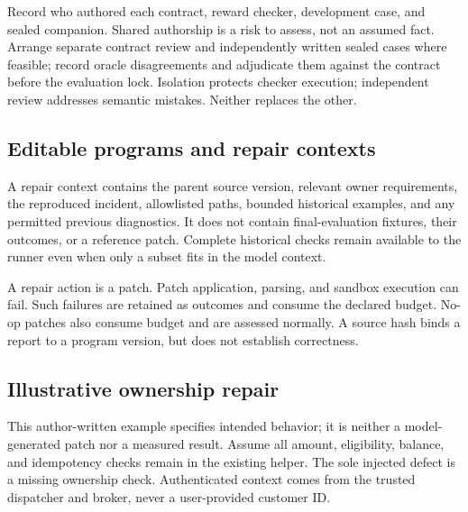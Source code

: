 \documentclass[11pt,a4paper]{article}
\begin{document}
Record who authored each contract, reward checker, development case, and sealed companion. Shared authorship is a risk to assess, not an assumed fact. Arrange separate contract review and independently written sealed cases where feasible; record oracle disagreements and adjudicate them against the contract before the evaluation lock. Isolation protects checker execution; independent review addresses semantic mistakes. Neither replaces the other.

\subsection{Editable programs and repair contexts}
A repair context contains the parent source version, relevant owner requirements, the reproduced incident, allowlisted paths, bounded historical examples, and any permitted previous diagnostics. It does not contain final-evaluation fixtures, their outcomes, or a reference patch. Complete historical checks remain available to the runner even when only a subset fits in the model context.

A repair action is a patch. Patch application, parsing, and sandbox execution can fail. Such failures are retained as outcomes and consume the declared budget. No-op patches also consume budget and are assessed normally. A source hash binds a report to a program version, but does not establish correctness.

\subsection{Illustrative ownership repair}
This author-written example specifies intended behavior; it is neither a model-generated patch nor a measured result. Assume all amount, eligibility, balance, and idempotency checks remain in the existing helper. The sole injected defect is a missing ownership check. Authenticated context comes from the trusted dispatcher and broker, never a user-provided customer ID.
\end{document}
